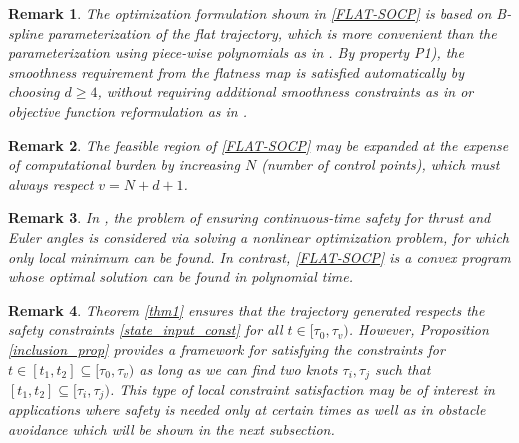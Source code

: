 \documentclass[journal,10pt]{IEEEtran}
\newtheorem{remark}{\bfseries Remark}
\newif\ifdraft
\newcommand{\XX}[1]{\ifdraft{\color{red}[{\bf XX}: #1]}\fi}
\newcommand{\VF}[1]{\ifdraft{\color{blue}[{\bf VF}: #1]}\fi}
\begin{document}
\begin{remark}
The optimization formulation shown in \eqref{FLAT-SOCP} is based on B-spline parameterization of the flat trajectory, which is more convenient than the parameterization using piece-wise polynomials as in  \cite{min_snap}. By property P1), the smoothness requirement from the flatness map is satisfied automatically by choosing $d\geq4$, without requiring additional smoothness constraints as in \cite{min_snap} or objective function reformulation as in \cite{polynomial}. 
\end{remark}

\begin{remark}
The feasible region of \eqref{FLAT-SOCP} may be expanded at the expense of computational burden by increasing $N$ (number of control points), which must always respect $v = N+d+1$.
\end{remark}

\begin{remark}
In \cite{Flat_trajectory_design}, the problem of ensuring continuous-time safety for thrust and Euler angles is considered via solving a nonlinear optimization problem, for which only local minimum can be found.  In contrast, \eqref{FLAT-SOCP} is a convex program whose optimal solution can be found in polynomial time.
\end{remark}

\begin{remark} \label{Local_cst_rmk}
Theorem \ref{thm1} ensures that the trajectory generated respects the safety constraints \eqref{state_input_const} for all $t\in[\tau_0,\tau_v)$. 
However, Proposition \ref{inclusion_prop} provides a framework for satisfying the constraints for $t\in[t_1,t_2]\subseteq[\tau_0,\tau_v)$ as long as we can find two knots $\tau_i, \tau_j$ such that $[t_1,t_2]\subseteq [\tau_i,\tau_j)$. This type of local constraint satisfaction may be of interest in applications where safety is needed only at certain times as well as in obstacle avoidance which will be shown in the next subsection.  %
\end{remark}
\end{document}
